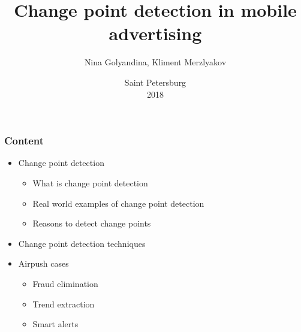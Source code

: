\documentclass[intlimits, 9pt, unicode]{beamer}
\title{Change point detection in mobile advertising}
\author{Nina Golyandina, Kliment Merzlyakov}
\institute{Saint Petersburg State University \\
    Mathematical faculty \\
     Applied statistics department \\
}
\date{
    Saint Petersburg\\
    2018
}
\begin{document}
\begin{frame}
    \titlepage
\end{frame}

\begin{frame}
    \frametitle{Content}

    \begin{itemize}
    	\item Change point detection
		     	 \begin{itemize}
	    		   \item What is change point detection
		    	   \item Real world examples of change point detection 
		    	   \item Reasons to detect change points
		    	  \end{itemize}
        \item Change point detection techniques
        \item Airpush cases
		     	 \begin{itemize}
	    		   \item Fraud elimination
		    	   \item Trend extraction
		    	   \item Smart alerts
		    	  \end{itemize}
    \end{itemize}
\end{frame}
\end{document}
